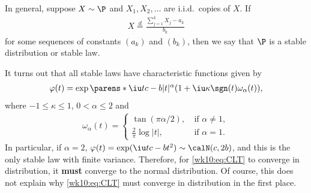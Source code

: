 \documentclass[../aipt.tex]{subfiles}
\begin{document}
In general, suppose $X \sim \P$ and $X_1,X_2,\ldots$ are i.i.d.\ copies of $X$. If 
\begin{align*}
X\overset{d}{=} \frac{\sum_{j=1}^k X_j-a_k}{b_k}
\end{align*} 
for some sequences of constants $(a_k)$ and $(b_k)$, then we say that $\P$ is a stable distribution or stable law.

It turns out that all stable laws have characteristic functions given by
\begin{align*}
\varphi(t)= \exp\parens*{\iu tc-b|t|^{\alpha}(1+\iu\kappa\sgn(t)\omega_{\alpha}(t))},
\end{align*}
where $-1\leq\kappa\leq 1$, $0<\alpha\leq2$ and 
\begin{align*}
\omega_{\alpha}(t)=
\begin{cases}
\tan(\pi \alpha/2), &\ \text{if $\alpha \neq 1$},\\
\frac{2}{\pi}\log |t|, &\ \text{if $\alpha =1$}.
\end{cases}
\end{align*}
In particular, if $\alpha = 2$, $\varphi(t)=\exp(\iu tc-bt^2) \sim \calN(c,2b)$, and this is the only stable law with finite variance. Therefore, for \cref{wk10:eq:CLT} to converge in distribution, it \textbf{must} converge to the normal distribution. Of course, this does not explain why \cref{wk10:eq:CLT} must converge in distribution in the first place.

%
%

\end{document}
